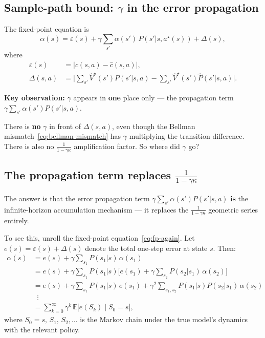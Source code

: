 \documentclass[11pt]{article}
\newcommand{\Vhatstar}{\hat V^\star}
\begin{document}
\subsection{Sample-path bound: $\gamma$ in the error propagation}

The fixed-point equation is
\begin{equation}\label{eq:fp-again}
  \alpha(s)
  = \varepsilon(s)
  + \gamma \sum_{s'} \alpha(s')\, P(s'|s,a^\star(s))
  + \Delta(s),
\end{equation}
where
\begin{align}
  \varepsilon(s) &= |c(s,a) - \hat c(s,a)|, \label{eq:eps} \\
  \Delta(s,a) &= \bigl|\textstyle\sum_{s'} \Vhatstar(s') P(s'|s,a) - \textstyle\sum_{s'} \Vhatstar(s') \hat P(s'|s,a)\bigr|. \label{eq:Delta}
\end{align}

\textbf{Key observation:} $\gamma$ appears in \textbf{one} place only ---
the propagation term $\gamma \sum_{s'} \alpha(s') P(s'|s,a)$.

There is \textbf{no} $\gamma$ in front of $\Delta(s,a)$, even though the
Bellman mismatch~\eqref{eq:bellman-mismatch} has $\gamma$ multiplying the
transition difference.  There is also no $\frac{1}{1-\gamma\kappa}$ amplification
factor.  So where did $\gamma$ go?

\subsection{The propagation term replaces $\frac{1}{1-\gamma\kappa}$}

The answer is that the error propagation term $\gamma \sum_{s'} \alpha(s') P(s'|s,a)$
\textbf{is} the infinite-horizon accumulation mechanism --- it replaces the
$\frac{1}{1-\gamma\kappa}$ geometric series entirely.

To see this, unroll the fixed-point equation~\eqref{eq:fp-again}.  Let
$e(s) = \varepsilon(s) + \Delta(s)$ denote the total one-step error at state
$s$.  Then:
\begin{align}
  \alpha(s)
  &= e(s) + \gamma \sum_{s_1} P(s_1|s) \,\alpha(s_1) \nonumber \\
  &= e(s) + \gamma \sum_{s_1} P(s_1|s)
     \bigl[e(s_1) + \gamma \sum_{s_2} P(s_2|s_1)\, \alpha(s_2)\bigr] \nonumber \\
  &= e(s) + \gamma \sum_{s_1} P(s_1|s)\, e(s_1)
     + \gamma^2 \sum_{s_1, s_2} P(s_1|s) P(s_2|s_1)\, \alpha(s_2) \nonumber \\
  &\;\;\vdots \nonumber \\
  &= \sum_{k=0}^{\infty} \gamma^k
     \,\mathbb{E}\bigl[e(S_k) \;\big|\; S_0 = s\bigr], \label{eq:unrolled}
\end{align}
where $S_0 = s,\, S_1,\, S_2, \ldots$ is the Markov chain under the true
model's dynamics with the relevant policy.
\end{document}
